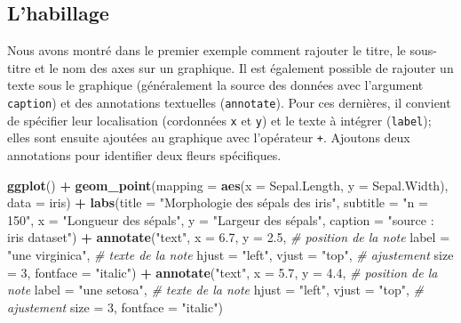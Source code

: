 \documentclass[
  11pt,
  french,
]{book}
\makeatletter
\newenvironment{Shaded}{\begin{snugshade}}{\end{snugshade}}
\newcommand{\CommentTok}[1]{\textcolor[rgb]{0.56,0.35,0.01}{\textit{#1}}}
\newcommand{\DataTypeTok}[1]{\textcolor[rgb]{0.13,0.29,0.53}{#1}}
\newcommand{\DecValTok}[1]{\textcolor[rgb]{0.00,0.00,0.81}{#1}}
\newcommand{\FloatTok}[1]{\textcolor[rgb]{0.00,0.00,0.81}{#1}}
\newcommand{\KeywordTok}[1]{\textcolor[rgb]{0.13,0.29,0.53}{\textbf{#1}}}
\newcommand{\NormalTok}[1]{#1}
\newcommand{\OperatorTok}[1]{\textcolor[rgb]{0.81,0.36,0.00}{\textbf{#1}}}
\newcommand{\StringTok}[1]{\textcolor[rgb]{0.31,0.60,0.02}{#1}}
\newenvironment{kframe}{%
\medskip{}
\setlength{\fboxsep}{.8em}
 \def\at@end@of@kframe{}%
 \ifinner\ifhmode%
  \def\at@end@of@kframe{\end{minipage}}%
  \begin{minipage}{\columnwidth}%
 \fi\fi%
 \def\FrameCommand##1{\hskip\@totalleftmargin \hskip-\fboxsep
 \colorbox{shadecolor}{##1}\hskip-\fboxsep
     \hskip-\linewidth \hskip-\@totalleftmargin \hskip\columnwidth}%
 \MakeFramed {\advance\hsize-\width
   \@totalleftmargin\z@ \linewidth\hsize
   \@setminipage}}%
 {\par\unskip\endMakeFramed%
 \at@end@of@kframe}
\renewenvironment{Shaded}{\begin{kframe}}{\end{kframe}}
\makeatother
\begin{document}
\hypertarget{sect0313}{%
\subsection{L'habillage}\label{sect0313}}

Nous avons montré dans le premier exemple comment rajouter le titre, le sous-titre et le nom des axes sur un graphique. Il est également possible de rajouter un texte sous le graphique (généralement la source des données avec l'argument \texttt{caption}) et des annotations textuelles (\texttt{annotate}). Pour ces dernières, il convient de spécifier leur localisation (cordonnées \texttt{x} et \texttt{y}) et le texte à intégrer (\texttt{label}); elles sont ensuite ajoutées au graphique avec l'opérateur \texttt{+}. Ajoutons deux annotations pour identifier deux fleurs spécifiques.

\begin{Shaded}
\begin{Highlighting}[]
\KeywordTok{ggplot}\NormalTok{() }\OperatorTok{+}
\StringTok{  }\KeywordTok{geom_point}\NormalTok{(}\DataTypeTok{mapping =} \KeywordTok{aes}\NormalTok{(}\DataTypeTok{x =}\NormalTok{ Sepal.Length, }\DataTypeTok{y =}\NormalTok{ Sepal.Width), }\DataTypeTok{data =}\NormalTok{ iris) }\OperatorTok{+}
\StringTok{  }\KeywordTok{labs}\NormalTok{(}\DataTypeTok{title =} \StringTok{"Morphologie des sépals des iris"}\NormalTok{, }\DataTypeTok{subtitle =} \StringTok{"n = 150"}\NormalTok{,}
       \DataTypeTok{x =} \StringTok{"Longueur des sépals"}\NormalTok{, }
       \DataTypeTok{y =} \StringTok{"Largeur des sépals"}\NormalTok{,}
       \DataTypeTok{caption =} \StringTok{"source : iris dataset"}\NormalTok{) }\OperatorTok{+}
\StringTok{  }\KeywordTok{annotate}\NormalTok{(}\StringTok{"text"}\NormalTok{, }\DataTypeTok{x =} \FloatTok{6.7}\NormalTok{, }\DataTypeTok{y =} \FloatTok{2.5}\NormalTok{, }\CommentTok{# position de la note}
           \DataTypeTok{label =} \StringTok{"une virginica"}\NormalTok{,  }\CommentTok{# texte de la note}
           \DataTypeTok{hjust =} \StringTok{"left"}\NormalTok{, }\DataTypeTok{vjust =} \StringTok{"top"}\NormalTok{, }\CommentTok{# ajustement}
           \DataTypeTok{size =} \DecValTok{3}\NormalTok{, }\DataTypeTok{fontface =} \StringTok{"italic"}\NormalTok{) }\OperatorTok{+}\StringTok{ }
\StringTok{  }\KeywordTok{annotate}\NormalTok{(}\StringTok{"text"}\NormalTok{, }\DataTypeTok{x =} \FloatTok{5.7}\NormalTok{, }\DataTypeTok{y =} \FloatTok{4.4}\NormalTok{, }\CommentTok{# position de la note}
           \DataTypeTok{label =} \StringTok{"une setosa"}\NormalTok{,  }\CommentTok{# texte de la note}
           \DataTypeTok{hjust =} \StringTok{"left"}\NormalTok{, }\DataTypeTok{vjust =} \StringTok{"top"}\NormalTok{, }\CommentTok{# ajustement}
           \DataTypeTok{size =} \DecValTok{3}\NormalTok{, }\DataTypeTok{fontface =} \StringTok{"italic"}\NormalTok{) }
\end{Highlighting}
\end{Shaded}
\end{document}
